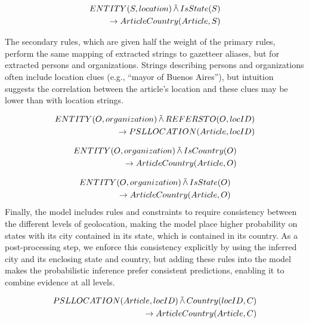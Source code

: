 \begin{align*}
    \begin{split}
        ENTITY(S, location) \softand IsState(S)\\
    \rightarrow ArticleCountry(Article, S)
\end{split}
\end{align*}

The secondary rules, which are given half the weight of the primary rules, perform the same mapping of extracted strings to gazetteer aliases, but for extracted persons and organizations. Strings describing persons and organizations often include location clues (e.g., ``mayor of Buenos Aires''), but intuition suggests the correlation between the article's location and these clues may be lower than with location strings. 

\begin{align*}
    \begin{split}
        ENTITY(O, organization) \softand REFERSTO(O, locID)\\
    \rightarrow PSLLOCATION(Article, locID)
\end{split}
\end{align*}


\begin{align*}
    \begin{split}
        ENTITY(O, organization) \softand IsCountry(O)\\
    \rightarrow ArticleCountry(Article, O)
\end{split}
\end{align*}


\begin{align*}
    \begin{split}
        ENTITY(O, organization) \softand IsState(O)\\
    \rightarrow ArticleCountry(Article, O)
\end{split}
\end{align*}
Finally, the model includes rules and constraints to require consistency between the different levels of geolocation, making the model place higher probability on states with its city contained in its state, which is contained in its country. As a post-processing step, we enforce this consistency explicitly by using the inferred city and its enclosing state and country, but adding these rules into the model makes the probabilistic inference prefer consistent predictions, enabling it to combine evidence at all levels.

\begin{align*}
    \begin{split}
        PSLLOCATION(Article, locID) \softand Country(locID, C)\\
    \rightarrow ArticleCountry(Article, C)
\end{split}
\end{align*}



